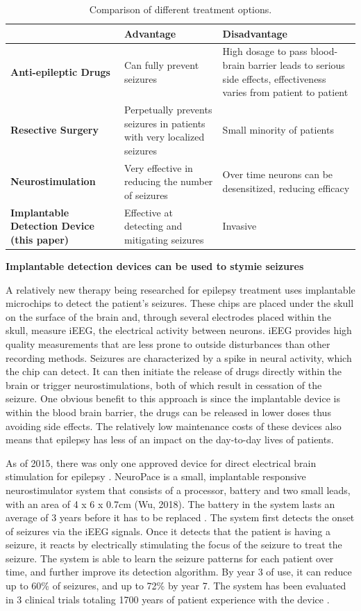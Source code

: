 \documentclass[usletter, 11pt]{extarticle}
\begin{document}
\begin{table}[!h]
	\centering
	\begin{tabularx}{\textwidth}{X|X|X}
		& \textbf{Advantage} & \textbf{Disadvantage} \\ \hline \hline
		\textbf{Anti-epileptic Drugs} & Can fully prevent seizures & High dosage to pass blood-brain barrier leads to serious side effects, effectiveness varies from patient to patient \\ \hline
		\textbf{Resective Surgery} & Perpetually prevents seizures in patients with very localized seizures & Small minority of patients \\ \hline
		\textbf{Neurostimulation} & Very effective in reducing the number of seizures & Over time neurons can be desensitized, reducing efficacy \\ \hline
		\textbf{Implantable Detection Device (this paper)} & Effective at detecting and mitigating seizures & Invasive
	\end{tabularx}
	\caption{Comparison of different treatment options.}
\end{table}

\vspace{11pt}
\textbf{Implantable detection devices can be used to stymie seizures}

A relatively new therapy being researched for epilepsy treatment uses implantable microchips to detect the patient’s seizures. These chips are placed under the skull on the surface of the brain and, through several electrodes placed within the skull, measure iEEG, the electrical activity between neurons. iEEG provides high quality measurements that are less prone to outside disturbances than other recording methods. Seizures are characterized by a spike in neural activity, which the chip can detect. It can then initiate the release of drugs directly within the brain or trigger neurostimulations, both of which result in cessation of the seizure. One obvious benefit to this approach is since the implantable device is within the blood brain barrier, the drugs can be released in lower doses thus avoiding side effects. The relatively low maintenance costs of these devices also means that epilepsy has less of an impact on the day-to-day lives of patients. 

As of 2015, there was only one approved device for direct electrical brain stimulation for epilepsy \cite{thomas2015}. NeuroPace is a small, implantable responsive neurostimulator system that consists of a processor, battery and two small leads, with an area of 4 x 6 x 0.7cm (Wu, 2018). The battery in the system lasts an average of 3 years before it has to be replaced \cite{neuropace}. The system first detects the onset of seizures via the iEEG signals. Once it detects that the patient is having a seizure, it reacts by electrically stimulating the focus of the seizure to treat the seizure. The system is able to learn the seizure patterns for each patient over time, and further improve its detection algorithm. By year 3 of use, it can reduce up to 60\% of seizures, and up to 72\% by year 7. The system has been evaluated in 3 clinical trials totaling 1700 years of patient experience with the device \cite{neuropacetrial}.
\end{document}
